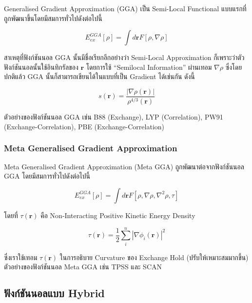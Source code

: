 Generalised Gradient Approximation (GGA) เป็น Semi-Local Functional แบบแรกที่ถูกพัฒนาขึ้นโดยมีสมการทั่วไปดังต่อไปนี้

\begin{equation}
  E_{e x}^{G G A}[\rho]
  =
  \int d \mathbf{r} F[\rho, \nabla \rho]
\end{equation}

สาเหตุที่ฟังก์ชันนอล GGA นั้นมีชื่อเรียกอีกอย่างว่า Semi-Local Approximation ก็เพราะว่าตัวฟังก์ชันนอลนั้นใช้อินทิกรัลของ $\mathbf{r}$
โดยการใช้ \enquote{Semilocal Information} ผ่านเทอม $\nabla \rho$ ซึ่งโดยปกติแล้ว GGA นั้นก็สามารถเขียนได้ในแบบที่เป็น Gradient
ได้เช่นกัน ดังนี้

\begin{equation}
  s(\mathbf{r})
  =
  \frac{|\nabla \rho(\mathbf{r})|}{\rho^{4 / 3}(\mathbf{r})}
\end{equation}

\noindent ตัวอย่างของฟังก์ชันนอล GGA เช่น B88 (Exchange), LYP (Correlation), PW91 (Exchange-Correlation), PBE
(Exchange-Correlation)

\subsubsection{Meta Generalised Gradient Approximation}

Meta Generalised Gradient Approximation (Meta GGA) ถูกพัฒนาต่อจากฟังก์ชันนอล GGA โดยมีสมการทั่วไปดังต่อไปนี้

\begin{equation}
  E_{e x}^{G G A}[\rho]
  =
  \int d \mathbf{r} F\left[\rho, \nabla \rho, \nabla^2 \rho, \tau\right]
\end{equation}

\noindent โดยที่ $\tau(\mathbf{r})$ คือ Non-Interacting Positive Kinetic Energy Density

\begin{equation}
  \tau(\mathbf{r})
  =
  \frac{1}{2} \sum_i^n\left|\nabla \phi_i(\mathbf{r})\right|^2
\end{equation}

\noindent ซึ่งเราใช้เทอม $\tau(\mathbf{r})$ ในการอธิบาย Curvature ของ Exchange Hold (ปรับให้เหมาะสมมากขึ้น)
ตัวอย่างของฟังก์ชันนอล Meta GGA เช่น TPSS และ SCAN

\subsection{ฟังก์ชันนอลแบบ Hybrid}

